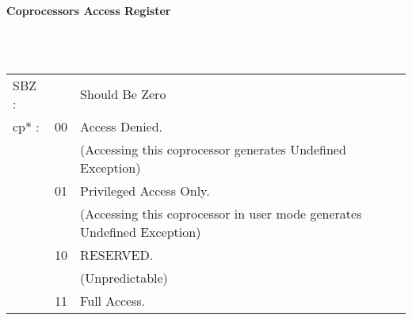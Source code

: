 \begin{minipage}{\textwidth}
\begin{framed}
	\begin{center}
		\textbf{Coprocessors Access Register}
	\end{center}
	\centering
	\ttfamily
	\begin{bytefield}[bitwidth=11px,endianness=big]{32}
		\\
			\small{}\\
	\end{bytefield}
	\begin{tabular}{p{1.1cm}p{0.3cm}p{12cm}}
	SBZ : & & Should Be Zero \\
	cp* : & 00 & Access Denied. \\
	&    & \scriptsize(Accessing this coprocessor generates Undefined Exception)\\
	& 01 & Privileged Access Only. \\
	&    & \scriptsize (Accessing this coprocessor in user mode generates Undefined Exception)\\
	& 10 & RESERVED. \\
	&    & \scriptsize (Unpredictable)\\
	& 11 & Full Access.\\
	\end{tabular} \\
\end{framed}
\end{minipage}
